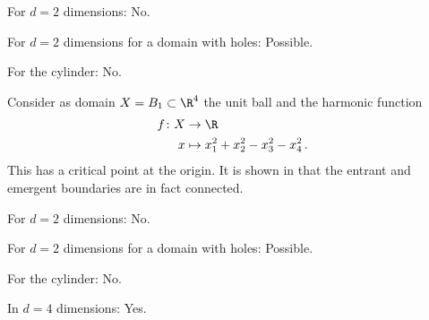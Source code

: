 \begin{frame}

  {\questionFlowthrough
  \begin{answer}
    \begin{itemize}
      \item For $d=2$ dimensions: No.
      \item For $d=2$ dimensions for a domain with holes: Possible.
        {\item For the cylinder: No.}
    \end{itemize}
  \end{answer}}
\end{frame}

\begin{frame}
  \begin{example}[Connected entrant boundary in $d=4$ dimensions, {\autocite[Ex.\ 4.7]{Koppenhoefer2024}}]\label{ex:n4}
    Consider as domain $X=B_1\subset\R^4$ the unit ball and
    the harmonic function 
    \begin{equation*}
      \begin{aligned}
      f\colon X&\to \R \\
      x &\mapsto x_1^2+x_2^2-x_3^2-x_4^2\,.
      \end{aligned}
      \label{eq:n4_deff}
    \end{equation*}
    This has a critical point at the origin.
    It is shown in \autocite[Prop.\ 4.8]{Koppenhoefer2024} that the entrant and emergent boundaries are in fact connected.
  \end{example} 
\end{frame}

\begin{frame}

  {\questionFlowthrough
  \begin{answer}
    \begin{itemize}
      \item For $d=2$ dimensions: No.
      \item For $d=2$ dimensions for a domain with holes: Possible.
      \item For the cylinder: No.
        {\item In $d=4$ dimensions: Yes.}
    \end{itemize}
  \end{answer}}
\end{frame}


